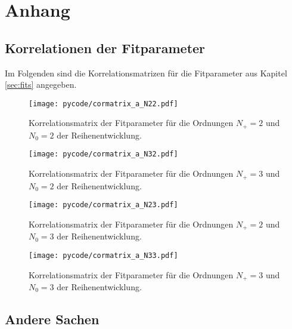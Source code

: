 \chapter{Anhang}

\section{Korrelationen der Fitparameter}
Im Folgenden sind die Korrelationsmatrizen für die Fitparameter aus Kapitel \ref{sec:fits} angegeben.
\begin{figure}
  \centering
  \texttt{[image: pycode/cormatrix\_a\_N22.pdf]}
  \caption{Korrelationsmatrix der Fitparameter für die Ordnungen $N_+ = \num{2}$ und $N_0 = \num{2}$ der Reihenentwicklung.}
  \label{fig:fitcor22}
\end{figure}

\begin{figure}
  \centering
  \texttt{[image: pycode/cormatrix\_a\_N32.pdf]}
  \caption{Korrelationsmatrix der Fitparameter für die Ordnungen $N_+ = \num{3}$ und $N_0 = \num{2}$ der Reihenentwicklung.}
  \label{fig:fitcor32}
\end{figure}

\begin{figure}
  \centering
  \texttt{[image: pycode/cormatrix\_a\_N23.pdf]}
  \caption{Korrelationsmatrix der Fitparameter für die Ordnungen $N_+ = \num{2}$ und $N_0 = \num{3}$ der Reihenentwicklung.}
  \label{fig:fitcor23}
\end{figure}

\begin{figure}
  \centering
  \texttt{[image: pycode/cormatrix\_a\_N33.pdf]}
  \caption{Korrelationsmatrix der Fitparameter für die Ordnungen $N_+ = \num{3}$ und $N_0 = \num{3}$ der Reihenentwicklung.}
  \label{fig:fitcor33}
\end{figure}

\section{Andere Sachen}


